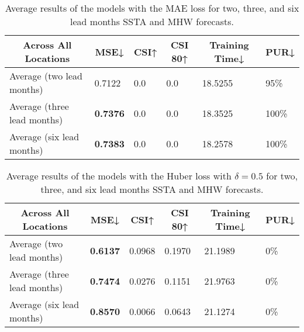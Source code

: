 \documentclass[11pt, a4paper]{article}
\begin{document}
\begin{table}[H]
\centering
\scriptsize
\caption{Average results of the models with the MAE loss for two, three, and six lead months SSTA and MHW forecasts.}\label{tb:maeall}
\begin{tabular}{llllll}
\multicolumn{1}{c}{\textbf{Across All Locations}} & \multicolumn{1}{c}{\textbf{MSE↓}} & \multicolumn{1}{c}{\textbf{CSI↑}} & \multicolumn{1}{c}{\textbf{CSI 80↑}} & \multicolumn{1}{c}{\textbf{Training Time↓}} & \multicolumn{1}{c}{\textbf{PUR↓}} \\ \hline
Average (two lead months)             & 0.7122                            & 0.0                               & 0.0                                  & 18.5255                                     & 95\%                              \\
Average (three lead months)           & \textbf{0.7376}                   & 0.0                               & 0.0                                  & 18.3525                                     & 100\%                             \\
Average (six lead months)             & \textbf{0.7383}                   & 0.0                               & 0.0                                  & 18.2578                                     & 100\%
\end{tabular}
\end{table}

\begin{table}[H]
\centering
\scriptsize
\caption{Average results of the models with the Huber loss with $\delta=0.5$ for two, three, and six lead months SSTA and MHW forecasts.}\label{tb:huberall}
\begin{tabular}{llllll}
\multicolumn{1}{c}{\textbf{Across All Locations}} & \multicolumn{1}{c}{\textbf{MSE↓}} & \multicolumn{1}{c}{\textbf{CSI↑}} & \multicolumn{1}{c}{\textbf{CSI 80↑}} & \multicolumn{1}{c}{\textbf{Training Time↓}} & \multicolumn{1}{c}{\textbf{PUR↓}} \\ \hline
Average (two lead months)             & \textbf{0.6137}                   & 0.0968                            & 0.1970                               & 21.1989                                     & 0\%                               \\
Average (three lead months)           & \textbf{0.7474}                   & 0.0276                            & 0.1151                               & 21.9763                                     & 0\%                               \\
Average (six lead months)             & \textbf{0.8570}                   & 0.0066                            & 0.0643                               & 21.1274                                     & 0\%
\end{tabular}
\end{table}
\end{document}
